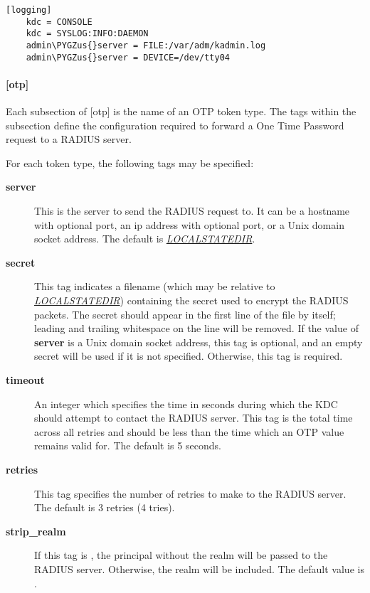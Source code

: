 \documentclass[letterpaper,10pt,english]{sphinxmanual}
\def\PYGZus{\char`\_}
\begin{document}
\begin{Verbatim}[commandchars=\\\{\}]
[logging]
    kdc = CONSOLE
    kdc = SYSLOG:INFO:DAEMON
    admin\PYGZus{}server = FILE:/var/adm/kadmin.log
    admin\PYGZus{}server = DEVICE=/dev/tty04
\end{Verbatim}


\paragraph{{[}otp{]}}
\label{admin/conf_files/kdc_conf:otp}\label{admin/conf_files/kdc_conf:id5}
Each subsection of {[}otp{]} is the name of an OTP token type.  The tags
within the subsection define the configuration required to forward a
One Time Password request to a RADIUS server.

For each token type, the following tags may be specified:
\begin{description}
\item[{\textbf{server}}] \leavevmode
This is the server to send the RADIUS request to.  It can be a
hostname with optional port, an ip address with optional port, or
a Unix domain socket address.  The default is
{\hyperref[mitK5defaults:paths]{\emph{LOCALSTATEDIR}}}.

\item[{\textbf{secret}}] \leavevmode
This tag indicates a filename (which may be relative to {\hyperref[mitK5defaults:paths]{\emph{LOCALSTATEDIR}}})
containing the secret used to encrypt the RADIUS packets.  The
secret should appear in the first line of the file by itself;
leading and trailing whitespace on the line will be removed.  If
the value of \textbf{server} is a Unix domain socket address, this tag
is optional, and an empty secret will be used if it is not
specified.  Otherwise, this tag is required.

\item[{\textbf{timeout}}] \leavevmode
An integer which specifies the time in seconds during which the
KDC should attempt to contact the RADIUS server.  This tag is the
total time across all retries and should be less than the time
which an OTP value remains valid for.  The default is 5 seconds.

\item[{\textbf{retries}}] \leavevmode
This tag specifies the number of retries to make to the RADIUS
server.  The default is 3 retries (4 tries).

\item[{\textbf{strip\_realm}}] \leavevmode
If this tag is , the principal without the realm will be
passed to the RADIUS server.  Otherwise, the realm will be
included.  The default value is .

\end{description}
\end{document}
